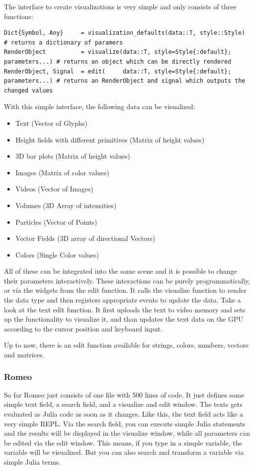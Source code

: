 The interface to create visualizations is very simple and only consists of three functions:
\begin{lstlisting}
Dict{Symbol, Any}     = visualization_defaults(data::T, style::Style) # returns a dictionary of paramers
RenderObject 		  = visualize(data::T, style=Style{:default}; parameters...) # returns an object which can be directly rendered
RenderObject, Signal  = edit(     data::T, style=Style{:default}; parameters...) # returns an RenderObject and signal which outputs the changed values
\end{lstlisting}

With this simple interface, the following data can be visualized:

\begin{itemize}
	\item Text (Vector of Glyphs)
	\item Height fields with different primitives (Matrix of height values)
	\item 3D bar plots (Matrix of height values)
	\item Images (Matrix of color values)
	\item Videos (Vector of Images)
	\item Volumes (3D Array of intensities)
	\item Particles (Vector of Points)
	\item Vector Fields (3D array of directional Vectors)
    \item Colors (Single Color values)
\end{itemize}

All of these can be integrated into the same scene and it is possible to change their parameters interactively.
These interactions can be purely programmatically, or via the widgets from the edit function.
It calls the visualize function to render the data type and then registers appropriate events to update the data.
Take a look at the text edit function.
It first uploads the text to video memory and sets up the functionality to visualize it, and than updates the text data on the GPU according to the cursor position and keyboard input.

Up to now, there is an edit function available for strings, colors, numbers, vectors and matrices.


\subsubsection{Romeo}
So far Romeo just consists of one file with 500 lines of code. It just defines some simple text field, a search field, and a visualize and edit window.
The texts gets evaluated as Julia code as soon as it changes. Like this, the text field acts like a very simple \ac{REPL}.
Via the search field, you can execute simple Julia statements and the results will be displayed in the visualize window, while all parameters can be edited via the edit window.
This means, if you type in a simple variable, the variable will be visualized. But you can also search and transform a variable via simple Julia terms.
